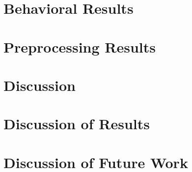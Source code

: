 \documentclass[11pt]{article}
\begin{document}
    \section{Behavioral Results}
                
    \section{Preprocessing Results}
                
\section{Discussion}

    \section{Discussion of Results}
            

    \section{Discussion of Future Work}
            


\end{document}
